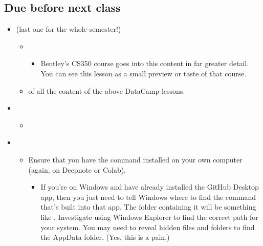 \documentclass[letterpaper,10pt,english]{jupyterBook}
\begin{document}
\subsection{Due before next class}
\label{\detokenize{course-schedule:id14}}\begin{itemize}
\item {} 
\sphinxAtStartPar
{} (last one for the whole semester!)
\begin{itemize}
\item {} 
\sphinxAtStartPar
{}
\begin{itemize}
\item {} 
\sphinxAtStartPar
{} Bentley’s CS350 course goes into this content in far greater detail.  You can see this lesson as a small preview or taste of that course.

\end{itemize}

\item {} 
\sphinxAtStartPar
{} of all the content of the above DataCamp lessons.

\end{itemize}

\item {} 
\sphinxAtStartPar
{}
\begin{itemize}
\item {} 
\sphinxAtStartPar
{\hyperref[\detokenize{chapter-14-dashboards::doc}]{}}

\end{itemize}

\item {} 
\sphinxAtStartPar
{}
\begin{itemize}
\item {} 
\sphinxAtStartPar
Ensure that you have the  command installed on your own computer (again,  on Deepnote or Colab).
\begin{itemize}
\item {} 
\sphinxAtStartPar
If you’re on Windows and have already installed the GitHub Desktop app, then you just need to tell Windows where to find the  command that’s built into that app.  The folder containing it will be something like .  Investigate using Windows Explorer to find the correct path for your system.  You may need to reveal hidden files and folders to find the AppData folder.  (Yes, this is a pain.)


\end{itemize}
\end{itemize}
\end{itemize}
\end{document}
